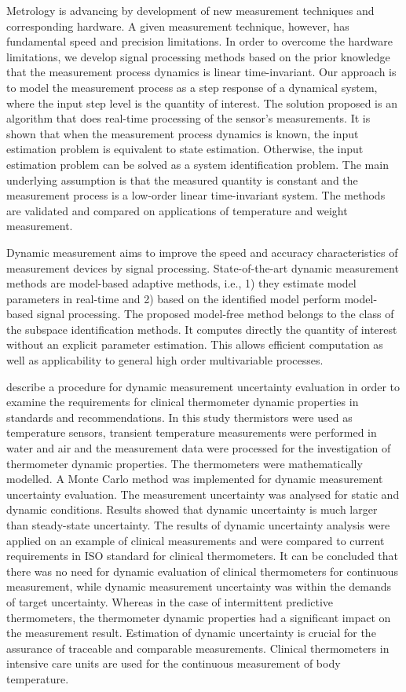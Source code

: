 \documentclass[11pt]{article}
\begin{document}
\citet{Markovsky15cep} Metrology is advancing by development of new measurement techniques and corresponding hardware. A given measurement technique, however, has fundamental speed and precision limitations. In order to overcome the hardware limitations, we develop signal processing methods based on the prior knowledge that the measurement process dynamics is linear time-invariant.
Our approach is to model the measurement process as a step response of a dynamical system, where the input step level is the quantity of interest. The solution proposed is an algorithm that does real-time processing of the sensor's measurements. It is shown that when the measurement process dynamics is known, the input estimation problem is equivalent to state estimation. Otherwise, the input estimation problem can be solved as a system identification problem. The main underlying assumption is that the measured quantity is constant and the measurement process is a low-order linear time-invariant system. The methods are validated and compared on applications of temperature and weight measurement.

\citet{Markovsky15ieee}Dynamic measurement aims to improve the speed and accuracy characteristics of measurement devices by signal processing. State-of-the-art dynamic measurement methods are model-based adaptive methods, i.e., 1) they estimate model parameters in real-time and 2) based on the identified model perform model-based signal processing. The proposed model-free method belongs to the class of the subspace identification methods. It computes directly the quantity of interest without an explicit parameter estimation. This allows efficient computation as well as applicability to general high order multivariable processes.

\citet{Ogorevc16}  describe a procedure for dynamic measurement uncertainty evaluation in order to examine the requirements for clinical thermometer dynamic properties in standards and recommendations. In this study thermistors were used as temperature sensors, transient temperature measurements were performed in water and air and the measurement data were processed for the investigation of thermometer dynamic properties. The thermometers were mathematically modelled. A Monte Carlo method was implemented for dynamic measurement uncertainty evaluation. The measurement uncertainty was analysed for static and dynamic conditions. Results showed that dynamic uncertainty is much larger than steady-state uncertainty. The results of dynamic uncertainty analysis were applied on an example of clinical measurements and were compared to current requirements in ISO standard for clinical thermometers. It can be concluded that there was no need for dynamic evaluation of clinical thermometers for continuous measurement, while dynamic measurement uncertainty was within the demands of target uncertainty. Whereas in the case of intermittent predictive thermometers, the thermometer dynamic properties had a significant impact on the measurement result. Estimation of dynamic uncertainty is crucial for the assurance of traceable and comparable measurements.
Clinical thermometers in intensive care units are used for the continuous measurement of body temperature. 
\end{document}
